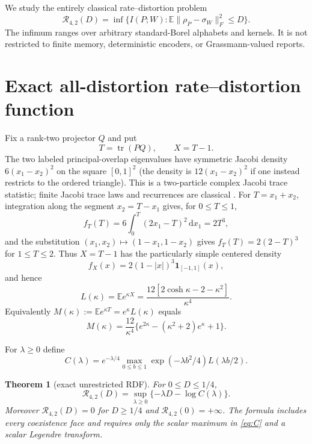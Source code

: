 \documentclass[11pt,a4paper]{article}
\newtheorem{theorem}{Theorem}[section]
\newcommand{\tr}{\operatorname{tr}}
\newcommand{\E}{\mathbb E}
\newcommand{\RDF}{\mathcal R_{4,2}}
\newcommand{\dd}{\mathrm d}
\begin{document}
We study the entirely classical rate--distortion problem
\begin{equation}\label{eq:rdfdef}
\RDF(D)=\inf\{I(P;W):\E\lVert\rho_P-\sigma_W\rVert_F^2\le D\}.
\end{equation}
The infimum ranges over arbitrary standard-Borel alphabets and kernels.  It is not restricted to finite memory, deterministic encoders, or Grassmann-valued reports.

\section{Exact all-distortion rate--distortion function}

Fix a rank-two projector $Q$ and put
\[
T=\tr(PQ),\qquad X=T-1.
\]
The two labeled principal-overlap eigenvalues have symmetric Jacobi density $6(x_1-x_2)^2$ on the square $[0,1]^2$ (the density is $12(x_1-x_2)^2$ if one instead restricts to the ordered triangle).  This is a two-particle complex Jacobi trace statistic; finite Jacobi trace laws and recurrences are classical \cite{ForresterKumar2022}.  For $T=x_1+x_2$, integration along the segment $x_2=T-x_1$ gives, for $0\le T\le1$,
\[
 f_T(T)=6\int_0^T(2x_1-T)^2\,\dd x_1=2T^3,
\]
and the substitution $(x_1,x_2)\mapsto(1-x_1,1-x_2)$ gives $f_T(T)=2(2-T)^3$ for $1\le T\le2$.  Thus $X=T-1$ has the particularly simple centered density
\begin{equation}\label{eq:overlapdensity}
f_X(x)=2(1-|x|)^3\mathbf1_{[-1,1]}(x),
\end{equation}
and hence
\begin{equation}\label{eq:L}
L(\kappa)=\E e^{\kappa X}=\frac{12[2\cosh\kappa-2-\kappa^2]}{\kappa^4}.
\end{equation}
Equivalently $M(\kappa):=\E e^{\kappa T}=e^\kappa L(\kappa)$ equals
\[
M(\kappa)=\frac{12}{\kappa^4}\{e^{2\kappa}-(\kappa^2+2)e^\kappa+1\}.
\]

For $\lambda\ge0$ define
\begin{equation}\label{eq:C}
C(\lambda)=e^{-\lambda/4}\max_{0\le b\le1}
\exp(-\lambda b^2/4)L(\lambda b/2).
\end{equation}

\begin{theorem}[exact unrestricted RDF]\label{thm:rdf}
For $0\le D\le1/4$,
\begin{equation}\label{eq:rdf}
\boxed{\RDF(D)=\sup_{\lambda\ge0}\{-\lambda D-\log C(\lambda)\}.}
\end{equation}
Moreover $\RDF(D)=0$ for $D\ge1/4$ and $\RDF(0)=+\infty$.  The formula includes every coexistence face and requires only the scalar maximum in \cref{eq:C} and a scalar Legendre transform.
\end{theorem}
\end{document}
